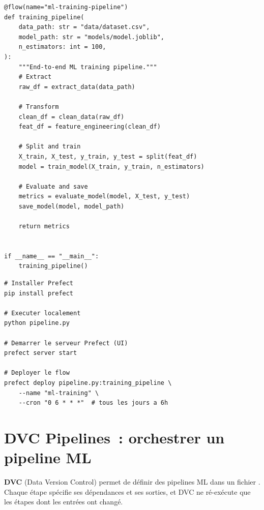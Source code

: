 \begin{codeblock}[title=\textbf{Pipeline ML complet avec Prefect}]
\begin{verbatim}
@flow(name="ml-training-pipeline")
def training_pipeline(
    data_path: str = "data/dataset.csv",
    model_path: str = "models/model.joblib",
    n_estimators: int = 100,
):
    """End-to-end ML training pipeline."""
    # Extract
    raw_df = extract_data(data_path)

    # Transform
    clean_df = clean_data(raw_df)
    feat_df = feature_engineering(clean_df)

    # Split and train
    X_train, X_test, y_train, y_test = split(feat_df)
    model = train_model(X_train, y_train, n_estimators)

    # Evaluate and save
    metrics = evaluate_model(model, X_test, y_test)
    save_model(model, model_path)

    return metrics


if __name__ == "__main__":
    training_pipeline()
\end{verbatim}
\end{codeblock}

\begin{codeblock}[title=\textbf{Ex\'ecution et d\'eploiement Prefect}]
\begin{verbatim}
# Installer Prefect
pip install prefect

# Executer localement
python pipeline.py

# Demarrer le serveur Prefect (UI)
prefect server start

# Deployer le flow
prefect deploy pipeline.py:training_pipeline \
    --name "ml-training" \
    --cron "0 6 * * *"  # tous les jours a 6h
\end{verbatim}
\end{codeblock}

\section{DVC Pipelines~: orchestrer un pipeline ML}
\label{sec:dvc-pipelines}
\index{DVC!pipelines}

\textbf{DVC} (Data Version Control) permet de d\'efinir des
pipelines ML dans un fichier . Chaque \'etape sp\'ecifie
ses d\'ependances et ses sorties, et DVC ne r\'e-ex\'ecute que les \'etapes
dont les entr\'ees ont chang\'e.

